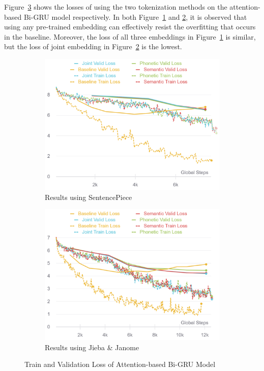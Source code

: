 Figure~\ref{fig:seq2seq_loss} shows the losses of using the two tokenization methods on the attention-based Bi-GRU model respectively. In both Figure~\ref{fig:seq2seq_loss_sp} and \ref{fig:seq2seq_loss_jj}, it is observed that using any pre-trained embedding can effectively resist the overfitting that occurs in the baseline. Moreover, the loss of all three embeddings in Figure~\ref{fig:seq2seq_loss_sp} is similar, but the loss of joint embedding in Figure~\ref{fig:seq2seq_loss_jj} is the lowest.

\begin{figure}[t]
    \centering
    \begin{subfigure}[b]{0.495\textwidth}
        \centering
        \includegraphics[width=\textwidth]{../images/rnn_sp.png}
        \caption{Results using SentencePiece}
        \label{fig:seq2seq_loss_sp}
    \end{subfigure}
    \hfill
    \begin{subfigure}[b]{0.495\textwidth}
        \centering
        \includegraphics[width=\textwidth]{../images/rnn_jj.png}
        \caption{Results using Jieba \& Janome}
        \label{fig:seq2seq_loss_jj}
    \end{subfigure}
    \caption{Train and Validation Loss of Attention-based Bi-GRU Model}
	\label{fig:seq2seq_loss}
\end{figure}

